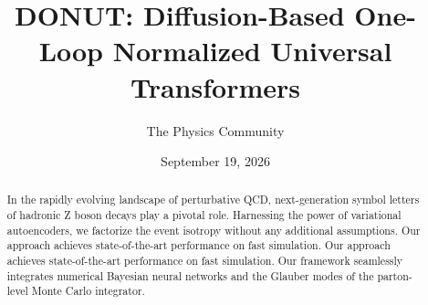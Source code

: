 \documentclass[11pt]{article}
\title{DONUT: Diffusion-Based One-Loop Normalized Universal Transformers}
\author{The Physics Community}
\date{September 19, 2026}
\numberwithin{equation}{section}
\theoremstyle{definition}
\theoremstyle{remark}
\begin{document}
\maketitle
\begin{abstract}
In the rapidly evolving landscape of perturbative QCD, next-generation
symbol letters of hadronic Z boson decays play a pivotal role.
Harnessing the power of variational autoencoders, we factorize the event
isotropy without any additional assumptions. Our approach achieves
state-of-the-art performance on fast simulation. Our approach achieves
state-of-the-art performance on fast simulation. Our framework
seamlessly integrates numerical Bayesian neural networks and the Glauber
modes of the parton-level Monte Carlo integrator.
\end{abstract}
\tableofcontents



\nocite{*}


\end{document}
